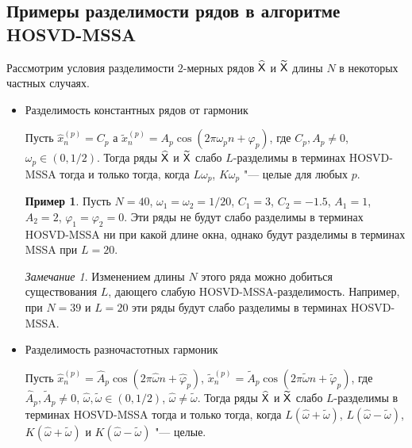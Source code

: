 \documentclass[specialist,
    substylefile = spbu.rtx,
    subf,href,colorlinks=true, 12pt]{disser}
\theoremstyle{plain}
\theoremstyle{definition}
\newtheorem{example}{Пример}[section]
\theoremstyle{remark}
\newtheorem*{remark}{Замечание}
\begin{document}
    \subsection{Примеры разделимости рядов в алгоритме HOSVD-MSSA}\label{subsec:hosvd-mssa-sep-example}
    Рассмотрим условия разделимости $2$-мерных рядов $\widehat{\mathsf{X}}$ и $\widetilde{\mathsf{X}}$ длины $N$ в некоторых
    частных случаях.
    \begin{itemize}
        \item Разделимость константных рядов от гармоник

        Пусть $\hat{x}_n^{(p)} = C_p$ а
        $\tilde{x}_n^{(p)} = A_p \cos(2\pi \omega_p n + \varphi_p)$,
        где $C_p, A_p \ne 0$, $\omega_p \in (0, 1/2)$.
        Тогда ряды $\widehat{\mathsf{X}}$ и $\widetilde{\mathsf{X}}$ слабо $L$-разделимы в терминах HOSVD-MSSA тогда и только тогда,
        когда $L\omega_p$, $K\omega_p$ "--- целые для любых $p$.
        \begin{example}
            \label{ex:no-sep}
            Пусть $N=40$, $\omega_1=\omega_2=1/20$, $C_1 = 3$, $C_2=-1.5$, $A_1 = 1$, $A_2 = 2$,
            $\varphi_1 = \varphi_2 = 0$.
            Эти ряды не будут слабо разделимы в терминах HOSVD-MSSA ни при какой длине окна, однако
            будут разделимы в терминах MSSA при $L=20$.
        \end{example}
        \begin{remark}
            Изменением длины $N$ этого ряда можно добиться существования $L$, дающего слабую HOSVD-MSSA-разделимость.
            Например, при $N=39$ и $L=20$ эти ряды будут слабо разделимы в терминах HOSVD-MSSA.
        \end{remark}

        \item Разделимость разночастотных гармоник

        Пусть $\hat{x}_n^{(p)} = \widehat{A}_p \cos(2 \pi \hat{\omega} n + \hat{\varphi}_p)$,
        $\tilde{x}_n^{(p)} = \widetilde{A}_p \cos(2\pi \tilde{\omega} n + \tilde{\varphi}_p)$,
        где $\widehat{A}_p, \widetilde{A}_p \ne 0$, \linebreak $\hat{\omega}, \tilde{\omega} \in (0, 1/2)$,
        $\hat{\omega} \ne \tilde{\omega}$.
        Тогда ряды $\widehat{\mathsf{X}}$ и $\widetilde{\mathsf{X}}$ слабо $L$-разделимы в терминах HOSVD-MSSA тогда и только тогда,
        когда $L(\hat{\omega} + \tilde{\omega})$, $L(\hat{\omega} - \tilde{\omega})$,
        $K(\hat{\omega} + \tilde{\omega})$ и $K(\hat{\omega} - \tilde{\omega})$ "--- целые.
    \end{itemize}
\end{document}
